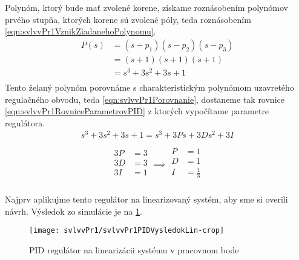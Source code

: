 \documentclass[../main.tex]{subfiles}
\begin{document}
	Polynóm, ktorý bude mať zvolené korene, získame roznásobením polynómov prvého stupňa, ktorých korene sú zvolené póly, teda roznásobením \cref{eqn:svlvvPr1VznikZiadanehoPolynomu}. 
		\begin{equation}
	\begin{aligned}
	P(s) &= (s - p_1)(s - p_2)(s - p_3) \\
		 &= (s + 1)(s + 1)(s + 1) \\
		 &= s^3 + 3s^2 + 3s + 1\\
	\end{aligned}
	\label{eqn:svlvvPr1VznikZiadanehoPolynomu}
	\end{equation}
	Tento želaný polynóm porovnáme s charakteristickým polynómom uzavretého regulačného obvodu, teda \cref{eqn:svlvvPr1Porovnanie}, dostaneme tak rovnice \cref{eqn:svlvvPr1RovniceParametrovPID} z ktorých vypočítame parametre regulátora.
	\begin{equation}
	\begin{aligned}
		s^3 + 3s^2 + 3s + 1= s^3 + 3Ps + 3Ds^2 + 3I\\
	\end{aligned}
	\label{eqn:svlvvPr1Porovnanie}
	\end{equation}
	\begin{equation}
	\begin{aligned}
		\begin{matrix}
		3P &= 3 \\
		3D &= 3 \\ 
		3I &= 1 \\
		\end{matrix}
		\implies 
		\begin{matrix}
		P &= 1 \\
		D &= 1 \\ 
		I &= \frac{1}{3}  \\
		\end{matrix}
	\end{aligned}
	\label{eqn:svlvvPr1RovniceParametrovPID}
	\end{equation}

    Najprv aplikujme tento regulátor na linearizovaný systém, aby sme si overili návrh. Výsledok zo simulácie je na \cref{fig:svlvvPr1VysledokPIDLin}.
    \begin{figure}[h!]
        \centering 
        \texttt{[image: svlvvPr1/svlvvPr1PIDVysledokLin-crop]}
        \caption{PID regulátor na linearizácii systému v pracovnom bode}
        \label{fig:svlvvPr1VysledokPIDLin}
    \end{figure} 
\end{document}
